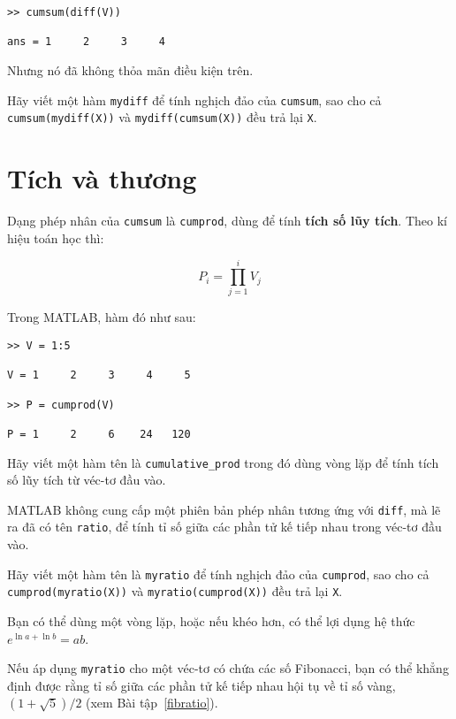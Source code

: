 \documentclass[12pt]{book}
\begin{document}
\begin{verbatim}
>> cumsum(diff(V))

ans = 1     2     3     4
\end{verbatim}
%
Nhưng nó đã không thỏa mãn điều kiện trên.

\begin{ex}
Hãy viết một hàm {\tt mydiff} để tính nghịch đảo của 
{\tt cumsum}, sao cho cả {\tt cumsum(mydiff(X))} và
{\tt mydiff(cumsum(X))} đều trả lại {\tt X}.
\end{ex}


\section{Tích và thương}

Dạng phép nhân của {\tt cumsum} là {\tt cumprod}, dùng để
tính {\bf tích số lũy tích}.  Theo kí hiệu toán học thì:

\[ P_i = \prod_{j=1}^i V_j \]

Trong MATLAB, hàm đó như sau:

\begin{verbatim}
>> V = 1:5

V = 1     2     3     4     5

>> P = cumprod(V)

P = 1     2     6    24   120
\end{verbatim}
%
\begin{ex}
Hãy viết một hàm tên là \verb#cumulative_prod# trong đó dùng
vòng lặp để tính tích số lũy tích từ véc-tơ đầu vào.
\end{ex}

MATLAB không cung cấp một phiên bản phép nhân tương ứng với
{\tt diff}, mà lẽ ra đã có tên {\tt ratio}, để tính tỉ số giữa các
phần tử kế tiếp nhau trong véc-tơ đầu vào.

\begin{ex}
Hãy viết một hàm tên là {\tt myratio} để tính nghịch đảo của
{\tt cumprod}, sao cho cả {\tt cumprod(myratio(X))} và
{\tt myratio(cumprod(X))} đều trả lại {\tt X}.

Bạn có thể dùng một vòng lặp, hoặc nếu khéo hơn, có thể lợi dụng
hệ thức $e^{\ln a + \ln b} = a b$.

Nếu áp dụng {\tt myratio} cho một véc-tơ có chứa các số Fibonacci,
bạn có thể khẳng định được rằng tỉ số giữa các phần tử kế tiếp nhau 
hội tụ về tỉ số vàng, $(1+\sqrt{5})/2$ (xem Bài tập~\ref{fibratio}).
\end{ex}
\end{document}

